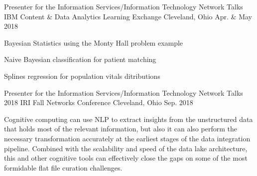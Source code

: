 

\begin{cventries}

  \cventry
    {Presenter for the Information Services/Information Technology Network Talks} %
    {IBM Content \& Data Analytics Learning Exchange} %
    {Cleveland, Ohio} %
    {Apr. \& May 2018} %
    {
      \begin{cvitems} %
        \item {Bayesian Statistics using the Monty Hall problem example}
        \item {Naive Bayesian classification for patient matching}
        \item {Splines regression for population vitals ditributions}
      \end{cvitems}
    }

  \cventry
    {Presenter for the Information Services/Information Technology Network Talks} %
    {2018 IRI Fall Networks Conference} %
    {Cleveland, Ohio} %
    {Sep. 2018} %
    {
      \begin{cvitems} %
        \item {Cognitive computing can use NLP to extract insights from the unstructured data that holds most of the relevant information, but also it can also perform the necessary transformation accurately at the earliest stages of the data integration pipeline.  Combined with the scalability and speed of the data lake architecture, this and other cognitive tools can effectively close the gaps on some of the most formidable flat file curation challenges.}
      \end{cvitems}
    }


\end{cventries}
